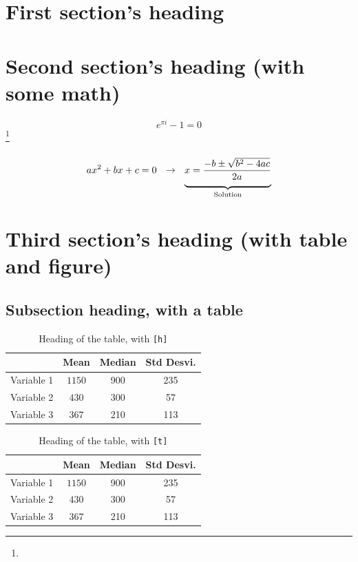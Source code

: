 \documentclass[12pt]{bppaper}
\begin{document}
\section{First section's heading}

\blindtext

\blindtext

\section{Second section's heading (with some math)}

\blindtext
$$e^{\pi i} - 1 = 0$$
\blindtext\footnote{\blindtext}

\blindtext
\begin{equation}
ax^2 +b x + c = 0 \ \ \to \ \ 
\llave{x = \dfrac{-b \pm \sqrt{b^2 - 4ac}}{2a}}{Solution}
\end{equation}
\blindtext 

\section{Third section's heading (with table and figure)}

\blindtext

\subsection{Subsection heading, with a table}

\blindtext
\begin{table}[h]
\centering
\caption{Heading of the table, with \texttt{[h]}}
\begin{tabular}{cccc} \toprule
    & Mean & Median & Std Desvi.\\ \midrule
    Variable 1 & $1150$ & 900 & 235 \\ 
    Variable 2 & $430$ & 300 & 57 \\ 
    Variable 3 & $367$ & 210 & 113 \\ \bottomrule
\end{tabular}
\end{table}
\blindtext

\blindtext
\begin{table}[t]
\centering
\caption{Heading of the table, with \texttt{[t]}}
\begin{tabular}{cccc} \toprule
    & Mean & Median & Std Desvi.\\ \midrule
    Variable 1 & $1150$ & 900 & 235 \\ 
    Variable 2 & $430$ & 300 & 57 \\ 
    Variable 3 & $367$ & 210 & 113 \\ \bottomrule
\end{tabular}\par
\end{table}
\blindtext
\blindtext
\end{document}
